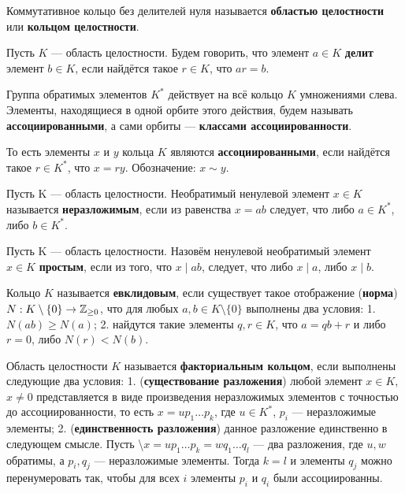 Коммутативное кольцо без делителей нуля называется \textbf{областью целостности} или \textbf{кольцом целостности}.

Пусть \(K\) --- область целостности. Будем говорить, что элемент \(a\in K\) \textbf{делит} элемент \(b\in K\), если найдётся такое \(r \in K\), что \(ar=b\).

Группа обратимых элементов \(K^*\) действует на всё кольцо \(K\) умножениями слева. Элементы, находящиеся в одной орбите этого действия, будем называть \textbf{ассоциированными}, а сами орбиты --- \textbf{классами ассоциированности}.

То есть элементы \(x\) и \(y\) кольца \(K\) являются \textbf{ассоциированными}, если найдётся такое \(r \in K^*\), что \(x=ry\). Обозначение: \(x \sim y\).

Пусть K --- область целостности. Необратимый ненулевой элемент \(x \in K\) называется \textbf{неразложимым}, если из равенства \(x=ab\) следует, что либо \(a \in K^*\), либо \(b \in K^*\).

Пусть K --- область целостности. Назовём ненулевой необратимый элемент \(x \in K\) \textbf{простым}, если из того, что \(x \mid ab\), следует, что либо \(x \mid a\), либо \(x \mid b\).

Кольцо \(K\) называется \textbf{евклидовым}, если существует такое отображение (\textbf{норма}) \(N : K \setminus \{0\} \rightarrow \mathbb{Z}_{\ge 0}\), что для любых \(a,b \in K \setminus \{0\}\) выполнены два условия:
1. \(N(ab) \ge N(a)\);
2. найдутся такие элементы \(q , r\in K\), что \(a=qb+r\) и либо \(r=0\), либо \(N(r) < N(b)\).


Область целостности \(K\) называется \textbf{факториальным кольцом}, если выполнены следующие два условия:
1. (\textbf{существование разложения}) любой элемент \(x \in K\), \(x \neq 0\) представляется в виде произведения неразложимых элементов с точностью до ассоциированности, то есть \(x = u p_1 \ldots p_k\), где \(u \in K^*\), \(p_i\) --- неразложимые элементы;
2. (\textbf{единственность разложения}) данное разложение единственно в следующем смысле. Пусть \textbackslash{}\(x = u p_1 \ldots p_k = w q_1 \ldots q_l\) --- два разложения, где \(u,w\) обратимы, а \(p_i,q_j\) --- неразложимые элементы. Тогда \(k=l\) и элементы \(q_j\) можно перенумеровать так, чтобы для всех \(i\) элементы \(p_i\) и \(q_i\) были ассоциированны.

